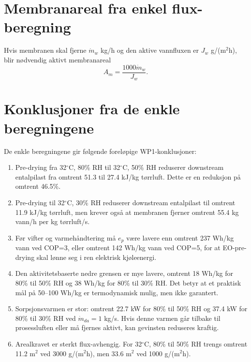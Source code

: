 \documentclass[11pt,a4paper]{article}
\begin{document}
\section{Membranareal fra enkel flux-beregning}

Hvis membranen skal fjerne $\dot m_w$ kg/h og den aktive vannfluxen er $J_w$ g/(m$^2$h), blir nødvendig aktivt membranareal
\begin{equation}
    A_m = \frac{1000\dot m_w}{J_w}.
\end{equation}

\begin{table}[h!]
\centering
\caption{Nødvendig aktivt membranareal for noen representative fluxer. $J_w$ er i g/(m$^2$h), og $A_m$ er i m$^2$.}
\label{tab:area}
\resizebox{0.85\textwidth}{!}{\AreaTable}
\end{table}

\section{Konklusjoner fra de enkle beregningene}

De enkle beregningene gir følgende foreløpige WP1-konklusjoner:

\begin{enumerate}
    \item Pre-drying fra 32$^\circ$C, 80\% RH til 32$^\circ$C, 50\% RH reduserer downstream entalpilast fra omtrent 51.3 til 27.4 kJ/kg tørrluft. Dette er en reduksjon på omtrent 46.5\%.
    \item Pre-drying til 32$^\circ$C, 30\% RH reduserer downstream entalpilast til omtrent 11.9 kJ/kg tørrluft, men krever også at membranen fjerner omtrent 55.4 kg vann/h per kg tørrluft/s.
    \item Før vifter og varmehåndtering må $e_p$ være lavere enn omtrent 237 Wh/kg vann ved COP=3, eller omtrent 142 Wh/kg vann ved COP=5, for at EO-pre-drying skal lønne seg i ren elektrisk kjøleenergi.
    \item Den aktivitetsbaserte nedre grensen er mye lavere, omtrent 18 Wh/kg for 80\% til 50\% RH og 38 Wh/kg for 80\% til 30\% RH. Det betyr at et praktisk mål på 50--100 Wh/kg er termodynamisk mulig, men ikke garantert.
    \item Sorpsjonsvarmen er stor: omtrent 22.7 kW for 80\% til 50\% RH og 37.4 kW for 80\% til 30\% RH ved $\dot m_{da}=1$ kg/s. Hvis denne varmen går tilbake til prosessluften eller må fjernes aktivt, kan gevinsten reduseres kraftig.
    \item Arealkravet er sterkt flux-avhengig. For 32$^\circ$C, 80\% til 50\% RH trengs omtrent 11.2 m$^2$ ved 3000 g/(m$^2$h), men 33.6 m$^2$ ved 1000 g/(m$^2$h).
\end{enumerate}
\end{document}
